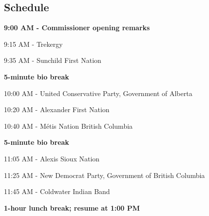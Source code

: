 \documentclass[12pt, letterpaper]{article}
\begin{document}
\newpage

\begin{center}
  {\section*{\normalfont\normalsize\bf Schedule}}
\end{center}

\vspace{12pt}

{\bf 9:00 AM - Commissioner opening remarks}

\vspace{12pt}

\hphantom{~~~~} 9:15 AM - Trekergy

\vspace{12pt}

\hphantom{~~~~} 9:35 AM - Sunchild First Nation

\vspace{12pt}

{\bf 5-minute bio break}

\vspace{12pt}

\hphantom{~~~~} 10:00 AM - United Conservative Party, Government of Alberta

\vspace{12pt}

\hphantom{~~~~} 10:20 AM - Alexander First Nation

\vspace{12pt}

\hphantom{~~~~} 10:40 AM - M\'{e}tis Nation British Columbia

\vspace{12pt}

{\bf 5-minute bio break}

\vspace{12pt}

\hphantom{~~~~} 11:05 AM - Alexis Sioux Nation

\vspace{12pt}

\hphantom{~~~~} 11:25 AM - New Democrat Party, Government of British Columbia

\vspace{12pt}

\hphantom{~~~~} 11:45 AM - Coldwater Indian Band

\vspace{12pt}

{\bf 1-hour lunch break; resume at 1:00 PM}
\end{document}
